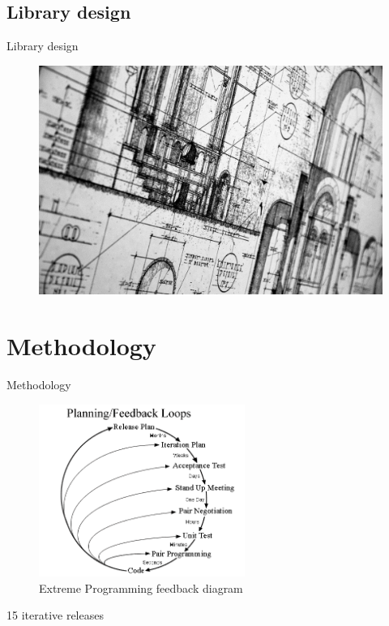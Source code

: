 \documentclass[10pt]{beamer}
\begin{document}
\subsection{Library design}
\begin{frame}{Library design}
  \begin{figure}[!h]
    \centering
    \includegraphics[width=1\textwidth]{../figures/abstraction.jpg}
    \label{fig:jssp}
  \end{figure}
\end{frame}

\section{Methodology}

\begin{frame}{Methodology}
  \begin{figure}
    \centering
    \includegraphics[width=0.6\textwidth]{../figures/xp.png}
    \caption{Extreme Programming feedback diagram}
    \label{fig:xp}
  \end{figure}
  15 iterative releases
\end{frame}
\end{document}
